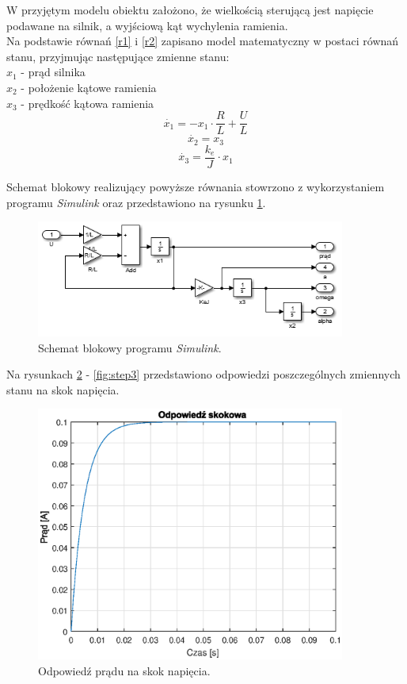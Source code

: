 W przyjętym modelu obiektu założono, że wielkością sterującą jest napięcie podawane na silnik, a wyjściową kąt wychylenia ramienia.\\
Na podstawie równań \ref{r1} i \ref{r2} zapisano model matematyczny w postaci równań stanu, przyjmując następujące zmienne stanu:\\
$x_1$ - prąd silnika\\
$x_2$ -  położenie kątowe ramienia\\
$x_3$ - prędkość kątowa ramienia\\
\begin{equation}\label{key}
\dot {x_1} = -x_1  \cdot \frac{R}{L} + \frac{U}{L}
\end{equation}
\begin{equation}\label{key}
\dot {x_2} = x_3
\end{equation}
\begin{equation}\label{key}
\dot {x_3} = \frac{k_e}{J} \cdot x_1
\end{equation}

Schemat blokowy realizujący powyższe równania stowrzono z wykorzystaniem programu \textit{Simulink} oraz przedstawiono na rysunku \ref{fig:model}. 

\begin{figure}[h]
	\centering
	\includegraphics[width=4in]{Figures/model.png}
	\caption{Schemat blokowy programu \textit{Simulink}.}
	\label{fig:model}
\end{figure}

Na rysunkach \ref{fig:step1} - \ref{fig:step3} przedstawiono odpowiedzi poszczególnych zmiennych stanu na skok napięcia.

\begin{figure}[h]
	\centering
	\includegraphics[width=4in]{Figures/step_curr.eps}
	\caption{Odpowiedź prądu na skok napięcia.}
	\label{fig:step1}
\end{figure}

